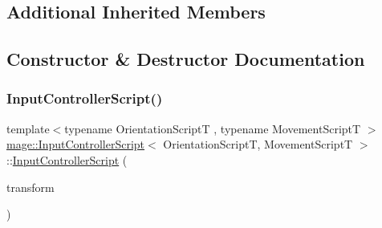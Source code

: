 \subsection*{Additional Inherited Members}


\subsection{Constructor \& Destructor Documentation}
\hypertarget{classmage_1_1_input_controller_script_adf1edb71170cb5184f201a64ad7455cb}{}\label{classmage_1_1_input_controller_script_adf1edb71170cb5184f201a64ad7455cb} 
\subsubsection{\texorpdfstring{Input\+Controller\+Script()}{InputControllerScript()}\hspace{0.1cm}{\footnotesize\ttfamily [1/3]}}
{\footnotesize\ttfamily template$<$typename Orientation\+ScriptT , typename Movement\+ScriptT $>$ \\
\hyperlink{classmage_1_1_input_controller_script}{mage\+::\+Input\+Controller\+Script}$<$ Orientation\+ScriptT, Movement\+ScriptT $>$\+::\hyperlink{classmage_1_1_input_controller_script}{Input\+Controller\+Script} (\begin{DoxyParamCaption}\item[{\hyperlink{classmage_1_1_transform_node}{Transform\+Node} $\ast$}]{transform }\end{DoxyParamCaption})\hspace{0.3cm}{\ttfamily [explicit]}}

\hypertarget{classmage_1_1_input_controller_script_a22de786b39180e18b8565b211797388d}{}\label{classmage_1_1_input_controller_script_a22de786b39180e18b8565b211797388d} 
